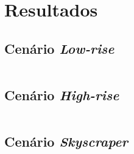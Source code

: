 \chapter{\label{chap:results}Resultados}

\section{Cenário \textit{Low-rise}}

\inputminted{text}{results/low-rise.txt}

\section{Cenário \textit{High-rise}}

\inputminted{text}{results/high-rise.txt}

\section{Cenário \textit{Skyscraper}}

\inputminted{text}{results/skyscraper.txt}